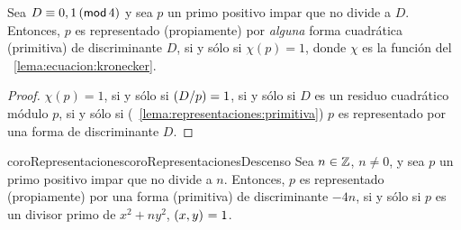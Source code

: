 \begin{teoRepresentaciones}\label{teo:representaciones}
	Sea $D\equiv 0,1\tmodulo[4]$ y sea $p$ un primo positivo impar
	que no divide a $D$. Entonces, $p$ es representado (propiamente)
	por \emph{alguna} forma cuadr\'atica (primitiva) de discriminante
	$D$, si y s\'olo si $\chi(p)=1$, donde $\chi$ es la funci\'on del
	\lemaname~\ref{lema:ecuacion:kronecker}.
\end{teoRepresentaciones}

\begin{proof}
	$\chi(p)=1$, si y s\'olo si $\tlegendre D p=1$, si y s\'olo si
	$D$ es un residuo cuadr\'atico m\'odulo $p$, si y s\'olo si
	(\lemaname~\ref{lema:representaciones:primitiva}) $p$ es
	representado por una forma de discriminante $D$.
\end{proof}

\begin{restatable}{coroRepresentaciones}{coroRepresentacionesDescenso}
	\label{coro:representaciones}
	Sea $n\in\Enteros$, $n\neq 0$, y sea $p$ un primo positivo
	impar que no divide a $n$. Entonces, $p$ es representado
	(propiamente) por una forma (primitiva) de discriminante $-4n$,
	si y s\'olo si $p$ es un divisor primo de $x^2+ny^2$,
	$\mcd{x,y}=1$.
\end{restatable}

% 

